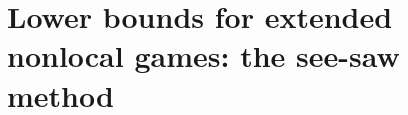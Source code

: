 %
%
%
%

\section{Lower bounds for extended nonlocal games: the see-saw method}
\label{sec:lower-bound-extended-nonlocal-games}

